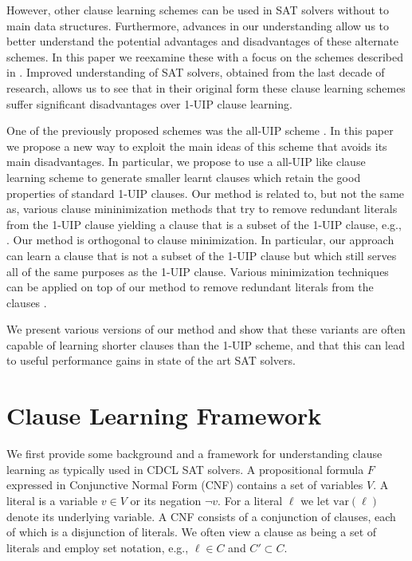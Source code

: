 \documentclass[runningheads]{llncs}
\newcommand{\sat}{SAT\xspace}
\newcommand{\var}{\text{var}}
\newcommand{\nf}[1]{{\color{red}{#1}}}
\begin{document}
However, other clause learning schemes can be used in SAT solvers
without %
\nf{alternations} to %
\nf{solvers'} main data structures. Furthermore, advances
in our understanding allow us to better understand the potential
advantages and disadvantages of these alternate schemes. In this paper
we reexamine these %
\nf{previously proposed alternative schemes,} with a
focus on the schemes described in
\cite{DBLP:conf/iccad/ZhangMMM01}. Improved understanding of \sat
solvers, obtained from the last decade of research, allows us to see
that in their original form these %
\nf{alternative} clause learning schemes suffer
significant disadvantages over 1-UIP clause learning.

One of the previously proposed schemes was the all-UIP scheme
\cite{DBLP:conf/iccad/ZhangMMM01}. In this paper we propose a new way
to exploit the main ideas of this scheme that avoids its main
disadvantages. In particular, we propose to use a all-UIP like clause
learning scheme to generate smaller learnt clauses which retain the
good properties of standard 1-UIP clauses. Our method is related to,
but not the same as, various clause mininimization methods that try to
remove redundant literals from the 1-UIP clause yielding a clause that
is a subset of the 1-UIP clause, e.g.,
\cite{DBLP:conf/sat/SorenssonB09,DBLP:conf/ijcai/LuoLXML17,DBLP:conf/sat/WieringaH13}.
Our method is orthogonal to clause minimization. In particular, our
approach can learn a clause that is not a subset of the 1-UIP clause but
which still serves all of the same purposes as the 1-UIP clause.
Various minimization techniques can be applied on top of our method to
remove redundant literals from the clauses %
\nf{we have learnt}.

We present various versions of our method and show that these variants
are often capable of learning shorter clauses than the 1-UIP scheme,
and that this can lead to useful performance gains in state of the art
\sat solvers.

\section{Clause Learning Framework}
We first provide some background and a framework for understanding
clause learning as typically used in CDCL \sat solvers. A
propositional formula $F$ expressed in Conjunctive Normal Form (CNF)
contains a set of variables $V$. A literal is a variable $v\in V$ or
its negation $\lnot v$. For a literal $\ell$ we let $\var(\ell)$
denote its underlying variable. A CNF consists of a conjunction of
clauses, each of which is a disjunction of literals. We often view a
clause as being a set of literals and employ set notation, e.g.,
$\ell\in C$ and $C'\subset C$. 
\end{document}
